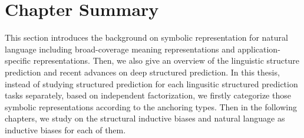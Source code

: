 \section{Chapter Summary}
\label{sec:bg:summary}
This section introduces the background on symbolic representation for
natural language including broad-coverage meaning representations and
application-specific representations. Then, we also give an overview
of the linguistic structure prediction and recent advances on deep
structured prediction. In this thesis, instead of studying structured
prediction for each lingusitic structured prediction tasks separately,
based on independent factorization, we firstly categorize those
symbolic representations according to the anchoring types. Then in the
following chapters, we study on the structural inductive biases and
natural language as inductive biases for each of them.


